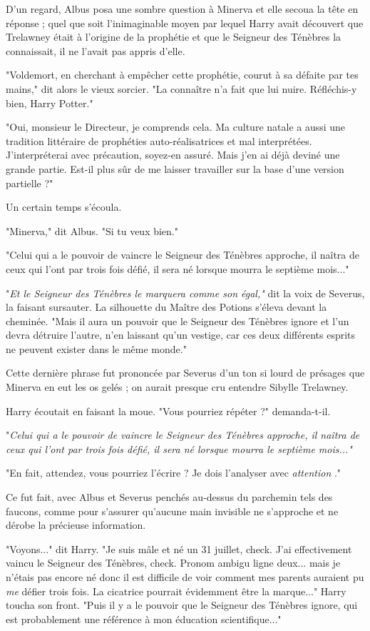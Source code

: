 D'un regard, Albus posa une sombre question à Minerva et elle secoua la tête en réponse ; quel que soit l'inimaginable moyen par lequel Harry avait découvert que Trelawney était à l'origine de la prophétie et que le Seigneur des Ténèbres la connaissait, il ne l'avait pas appris d'elle.

"Voldemort, en cherchant à empêcher cette prophétie, courut à sa défaite par tes mains," dit alors le vieux sorcier. "La connaître n'a fait que lui nuire. Réfléchis-y bien, Harry Potter."

"Oui, monsieur le Directeur, je comprends cela. Ma culture natale a aussi une tradition littéraire de prophéties auto-réalisatrices et mal interprétées. J'interpréterai avec précaution, soyez-en assuré. Mais j'en ai déjà deviné une grande partie. Est-il plus sûr de me laisser travailler sur la base d'une version partielle ?"

Un certain temps s'écoula.

"Minerva," dit Albus. "Si tu veux bien."

"Celui qui a le pouvoir de vaincre le Seigneur des Ténèbres approche, il naîtra de ceux qui l'ont par trois fois défié, il sera né lorsque mourra le septième mois..."

"\emph{Et le Seigneur des Ténèbres le marquera comme son égal," } dit la voix de Severus, la faisant sursauter. La silhouette du Maître des Potions s'éleva devant la cheminée. "Mais il aura un pouvoir que le Seigneur des Ténèbres ignore et l'un devra détruire l'autre, n'en laissant qu'un vestige, car ces deux différents esprits ne peuvent exister dans le même monde."

Cette dernière phrase fut prononcée par Severus d'un ton si lourd de présages que Minerva en eut les os gelés ; on aurait presque cru entendre Sibylle Trelawney.

Harry écoutait en faisant la moue. "Vous pourriez répéter ?" demanda-t-il.

"\emph{Celui qui a le pouvoir de vaincre le Seigneur des Ténèbres approche, il naîtra de ceux qui l'ont par trois fois défié, il sera né lorsque mourra le septième mois..."} 

"En fait, attendez, vous pourriez l'écrire ? Je dois l'analyser avec \emph{attention} ."

Ce fut fait, avec Albus et Severus penchés au-dessus du parchemin tels des faucons, comme pour s'assurer qu'aucune main invisible ne s'approche et ne dérobe la précieuse information.

"Voyons..." dit Harry. "Je suis mâle et né un 31 juillet, check. J'ai effectivement vaincu le Seigneur des Ténèbres, check. Pronom ambigu ligne deux... mais je n'étais pas encore né donc il est difficile de voir comment mes parents auraient pu \emph{me}  défier trois fois. La cicatrice pourrait évidemment être la marque..." Harry toucha son front. "Puis il y a le pouvoir que le Seigneur des Ténèbres ignore, qui est probablement une référence à mon éducation scientifique..."

